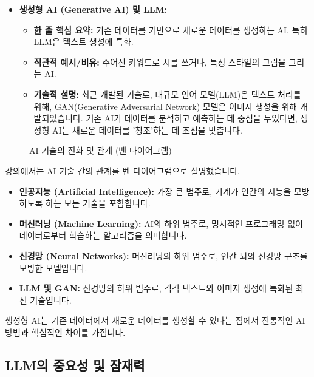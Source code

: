 \documentclass[11pt,a4paper]{article}
\theoremstyle{definition}
\begin{document}
\begin{itemize}
    \item \textbf{생성형 AI (Generative AI) 및 LLM:}
    \begin{itemize}
        \item \textbf{한 줄 핵심 요약:} 기존 데이터를 기반으로 새로운 데이터를 생성하는 AI. 특히 LLM은 텍스트 생성에 특화.
        \item \textbf{직관적 예시/비유:} 주어진 키워드로 시를 쓰거나, 특정 스타일의 그림을 그리는 AI.
        \item \textbf{기술적 설명:} 최근 개발된 기술로, 대규모 언어 모델(LLM)은 텍스트 처리를 위해, GAN(Generative Adversarial Network) 모델은 이미지 생성을 위해 개발되었습니다. 기존 AI가 데이터를 분석하고 예측하는 데 중점을 두었다면, 생성형 AI는 새로운 데이터를 '창조'하는 데 초점을 맞춥니다.
    \end{itemize}
\end{itemize}

\begin{figure}[h!]
    \centering
    \caption{AI 기술의 진화 및 관계 (벤 다이어그램)}
    \label{fig:ai_evolution}
\end{figure}

\begin{tcolorbox}[conceptbox={AI 기술 간의 관계}]
    강의에서는 AI 기술 간의 관계를 벤 다이어그램으로 설명했습니다.
    \begin{itemize}
        \item \textbf{인공지능 (Artificial Intelligence):} 가장 큰 범주로, 기계가 인간의 지능을 모방하도록 하는 모든 기술을 포함합니다.
        \item \textbf{머신러닝 (Machine Learning):} AI의 하위 범주로, 명시적인 프로그래밍 없이 데이터로부터 학습하는 알고리즘을 의미합니다.
        \item \textbf{신경망 (Neural Networks):} 머신러닝의 하위 범주로, 인간 뇌의 신경망 구조를 모방한 모델입니다.
        \item \textbf{LLM 및 GAN:} 신경망의 하위 범주로, 각각 텍스트와 이미지 생성에 특화된 최신 기술입니다.
    \end{itemize}
    생성형 AI는 기존 데이터에서 새로운 데이터를 생성할 수 있다는 점에서 전통적인 AI 방법과 핵심적인 차이를 가집니다.
\end{tcolorbox}

\subsection{LLM의 중요성 및 잠재력}
\end{document}
